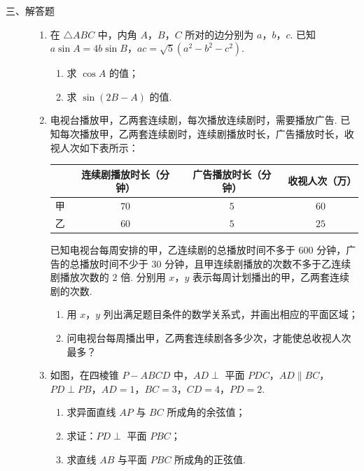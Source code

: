 \begin{description}

    \item[三、解答题]

    \begin{enumerate}[leftmargin=5pt]

      \addtocounter{enumi}{+14}

        \item 在 \(\triangle ABC\) 中，内角 \(A\)，\(B\)，\(C\) 所对的边分别为 \(a\)，\(b\)，\(c\). 已知 \(a\sin A=4b\sin B\)，\(ac=\sqrt5\left(a^2-b^2-c^2\right)\).

\begin{enumerate}
\item 求 \(\cos A\) 的值；
\item 求 \(\sin(2B-A)\) 的值.
\end{enumerate}

        \item 电视台播放甲，乙两套连续剧，每次播放连续剧时，需要播放广告. 已知每次播放甲，乙两套连续剧时，连续剧播放时长，广告播放时长，收视人次如下表所示：

\begin{center}
\begin{tabular}{c|ccc}
 & 连续剧播放时长（分钟） & 广告播放时长（分钟） & 收视人次（万）\\
\hline
甲 & \(70\) & \(5\) & \(60\)\\
乙 & \(60\) & \(5\) & \(25\)
\end{tabular}
\end{center}

已知电视台每周安排的甲，乙连续剧的总播放时间不多于 \(600\) 分钟，广告的总播放时间不少于 \(30\) 分钟，且甲连续剧播放的次数不多于乙连续剧播放次数的 \(2\) 倍. 分别用 \(x\)，\(y\) 表示每周计划播出的甲，乙两套连续剧的次数.

\begin{enumerate}
\item 用 \(x\)，\(y\) 列出满足题目条件的数学关系式，并画出相应的平面区域；
\item 问电视台每周播出甲，乙两套连续剧各多少次，才能使总收视人次最多？
\end{enumerate}

        \item 如图，在四棱锥 \(P-ABCD\) 中，\(AD\perp\) 平面 \(PDC\)，\(AD\parallel BC\)，\(PD\perp PB\)，\(AD=1\)，\(BC=3\)，\(CD=4\)，\(PD=2\).

\begin{enumerate}
\item 求异面直线 \(AP\) 与 \(BC\) 所成角的余弦值；
\item 求证：\(PD\perp\) 平面 \(PBC\)；
\item 求直线 \(AB\) 与平面 \(PBC\) 所成角的正弦值.
\end{enumerate}


\end{enumerate}
\end{description}
